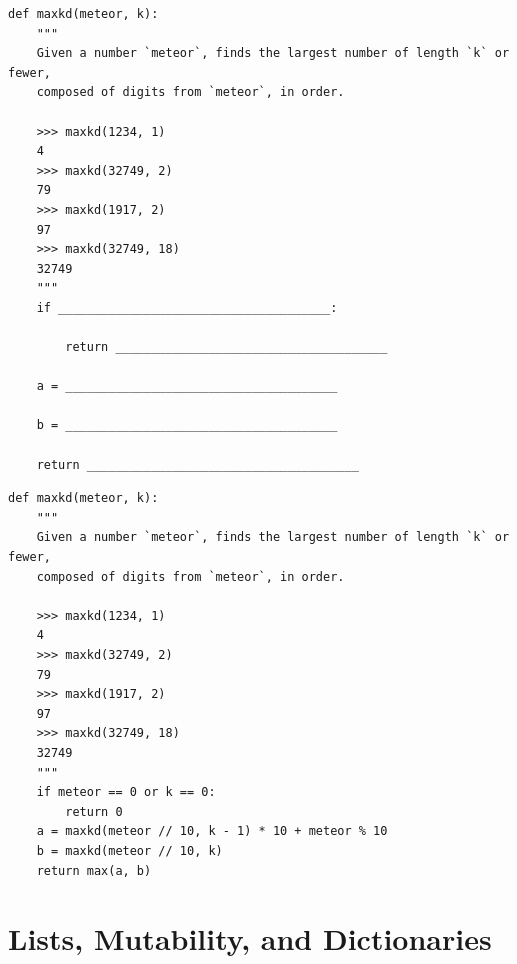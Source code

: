 \documentclass{exam}
\newlength{\currentparskip}
\newenvironment{blocksection}
{
    \setlength{\currentparskip}{\parskip}%
    \begin{minipage}{\linewidth}
    \setlength{\parskip}{\currentparskip}%
}
{
    \end{minipage}
}
\begin{document}
\begin{questions}
\begin{blocksection}
\begin{lstlisting}
def maxkd(meteor, k):
    """
    Given a number `meteor`, finds the largest number of length `k` or fewer,
    composed of digits from `meteor`, in order.

    >>> maxkd(1234, 1)
    4
    >>> maxkd(32749, 2)
    79
    >>> maxkd(1917, 2)
    97
    >>> maxkd(32749, 18)
    32749
    """
    if ______________________________________:

        return ______________________________________

    a = ______________________________________

    b = ______________________________________

    return ______________________________________
\end{lstlisting}
\end{blocksection}
\begin{solution}
    \begin{lstlisting}
def maxkd(meteor, k):
    """
    Given a number `meteor`, finds the largest number of length `k` or fewer,
    composed of digits from `meteor`, in order.

    >>> maxkd(1234, 1)
    4
    >>> maxkd(32749, 2)
    79
    >>> maxkd(1917, 2)
    97
    >>> maxkd(32749, 18)
    32749
    """
    if meteor == 0 or k == 0:
        return 0
    a = maxkd(meteor // 10, k - 1) * 10 + meteor % 10
    b = maxkd(meteor // 10, k)
    return max(a, b)
\end{lstlisting}
\end{solution}

\end{questions}

\section{Lists, Mutability, and Dictionaries}
\end{document}
